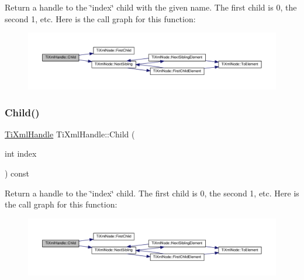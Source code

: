 Return a handle to the \char`\"{}index\char`\"{} child with the given name. The first child is 0, the second 1, etc. Here is the call graph for this function\+:
\nopagebreak
\begin{figure}[H]
\begin{center}
\leavevmode
\includegraphics[width=350pt]{classTiXmlHandle_a9903b035444ee36450fe00ede403f920_cgraph}
\end{center}
\end{figure}
\mbox{\label{classTiXmlHandle_a32585942abb28e03eea9c5223f38a659}} 
\subsubsection{\texorpdfstring{Child()}{Child()}\hspace{0.1cm}{\footnotesize\ttfamily [2/2]}}
{\footnotesize\ttfamily \hyperlink{classTiXmlHandle}{Ti\+Xml\+Handle} Ti\+Xml\+Handle\+::\+Child (\begin{DoxyParamCaption}\item[{int}]{index }\end{DoxyParamCaption}) const}

Return a handle to the \char`\"{}index\char`\"{} child. The first child is 0, the second 1, etc. Here is the call graph for this function\+:
\nopagebreak
\begin{figure}[H]
\begin{center}
\leavevmode
\includegraphics[width=350pt]{classTiXmlHandle_a32585942abb28e03eea9c5223f38a659_cgraph}
\end{center}
\end{figure}
\mbox{\label{classTiXmlHandle_afccc59d8a0daa8c5d78474fbed430ddb}} 
